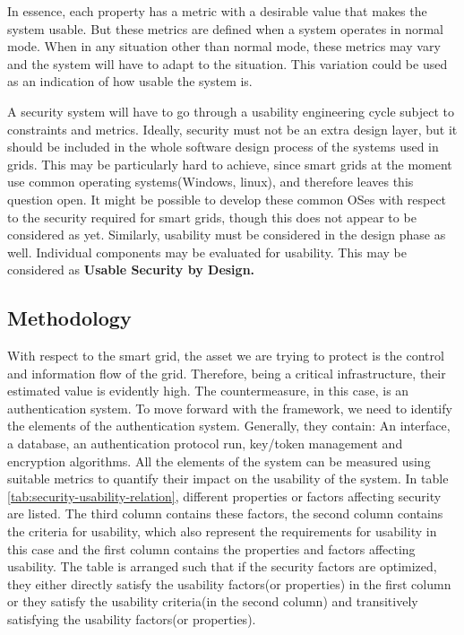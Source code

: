 In essence, each property has a metric with a desirable value that makes the system usable.
But these metrics are defined when a system operates in normal mode. When in any situation
other than normal mode, these metrics may vary and the system will have to adapt to the
situation. This variation could be used as an indication of how usable the system is.

A security system will have to go through a usability engineering cycle subject to constraints
and metrics. Ideally, security must not be an extra design layer, but it should be included in
the whole software design process of the systems used in grids. This may be particularly
hard to achieve, since smart grids at the moment use common operating systems(Windows,
linux), and therefore leaves this question open. It might be possible to develop these
common OSes with respect to the security required for smart grids, though this does not
appear to be considered as yet. Similarly, usability must be considered in the design phase as well. Individual components may be evaluated for usability. This may be considered as \textbf{Usable Security by Design.}


\subsection{Methodology}
With respect to the smart grid, the asset we are trying to protect is the control and information flow of the grid. Therefore, being a critical infrastructure, their estimated value is evidently high.   
\newline The countermeasure, in this case, is an authentication system. To move forward with the framework, 	we need to identify the elements of the authentication system. Generally, they contain: An interface, a database, an authentication protocol run, key/token management and encryption algorithms. All the elements of the system can be measured using suitable metrics to quantify their impact on the usability of the system. In table \ref{tab:security-usability-relation}, different properties or factors affecting security are listed. The third column contains these factors, the second column contains the criteria for usability, which also represent the requirements for usability in this case and the first column contains the properties and factors affecting usability. The table is arranged such that if the security factors are optimized, they either directly satisfy the usability factors(or properties) in the first column or they satisfy the usability criteria(in the second column) and transitively satisfying the usability factors(or properties). 


